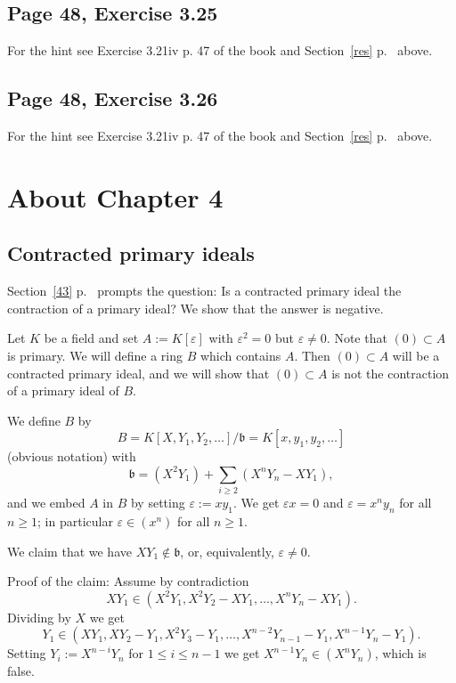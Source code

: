 \documentclass[parskip=half,fontsize=12pt]{scrartcl}%
\begin{document}
\subsection{Page 48, Exercise 3.25}%

For the hint see Exercise 3.21iv p. 47 of the book and Section~\ref{res} p.~\pageref{res} above.

\subsection{Page 48, Exercise 3.26}%

For the hint see Exercise 3.21iv p. 47 of the book and Section~\ref{res} p.~\pageref{res} above.

\section{About Chapter 4}%

\subsection{Contracted primary ideals}\label{cpi}%

Section~\ref{43} p.~\pageref{43} prompts the question: Is a contracted primary ideal the contraction of a primary ideal? We show that the answer is negative.

Let $K$ be a field and set $A:=K[\varepsilon]$ with $\varepsilon^2=0$ but $\varepsilon\ne0$. Note that $(0)\subset A$ is primary. We will define a ring $B$ which contains $A$. Then $(0)\subset A$ will be a contracted primary ideal, and we will show that $(0)\subset A$ is not the contraction of a primary ideal of $B$. 

We define $B$ by 
$$
B=K[X,Y_1,Y_2,\dots]/\mathfrak b=K[x,y_1,y_2,\dots]
$$ 
(obvious notation) with 
$$
\mathfrak b=(X^2Y_1)+\sum_{i\ge2}(X^nY_n-XY_1),
$$
and we embed $A$ in $B$ by setting $\varepsilon:=xy_1$. We get $\varepsilon x=0$ and $\varepsilon=x^ny_n$ for all $n\ge1$; in particular $\varepsilon\in(x^n)$ for all $n\ge1$.

We claim that we have $XY_1\notin\mathfrak b$, or, equivalently, $\varepsilon\ne0$.

Proof of the claim: Assume by contradiction 
$$
XY_1\in(X^2Y_1,X^2Y_2-XY_1,\dots,X^nY_n-XY_1).
$$ 
Dividing by $X$ we get 
$$
Y_1\in(XY_1,XY_2-Y_1,X^2Y_3-Y_1,\dots,X^{n-2}Y_{n-1}-Y_1,X^{n-1}Y_n-Y_1).
$$ 
Setting $Y_i:=X^{n-i}Y_n$ for $1\le i\le n-1$ we get $X^{n-1}Y_n\in(X^nY_n)$, which is false. 
\end{document}
